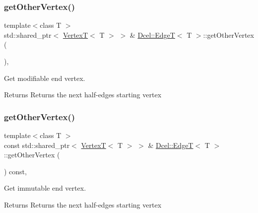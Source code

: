 \subsubsection{\texorpdfstring{get\+Other\+Vertex()}{getOtherVertex()}\hspace{0.1cm}{\footnotesize\ttfamily [1/2]}}
{\footnotesize\ttfamily template$<$class T $>$ \\
std\+::shared\+\_\+ptr$<$ \hyperlink{classDcel_1_1VertexT}{VertexT}$<$ T $>$ $>$ \& \hyperlink{classDcel_1_1EdgeT}{Dcel\+::\+EdgeT}$<$ T $>$\+::get\+Other\+Vertex (\begin{DoxyParamCaption}{ }\end{DoxyParamCaption})\hspace{0.3cm}{\ttfamily [inline]}, {\ttfamily [noexcept]}}



Get modifiable end vertex. 

\begin{DoxyReturn}{Returns}
Returns the next half-\/edge\textquotesingle{}s starting vertex 
\end{DoxyReturn}
\mbox{\label{classDcel_1_1EdgeT_ac2b40be7e45425caaf85b13b50bd89a0}} 
\subsubsection{\texorpdfstring{get\+Other\+Vertex()}{getOtherVertex()}\hspace{0.1cm}{\footnotesize\ttfamily [2/2]}}
{\footnotesize\ttfamily template$<$class T $>$ \\
const std\+::shared\+\_\+ptr$<$ \hyperlink{classDcel_1_1VertexT}{VertexT}$<$ T $>$ $>$ \& \hyperlink{classDcel_1_1EdgeT}{Dcel\+::\+EdgeT}$<$ T $>$\+::get\+Other\+Vertex (\begin{DoxyParamCaption}{ }\end{DoxyParamCaption}) const\hspace{0.3cm}{\ttfamily [inline]}, {\ttfamily [noexcept]}}



Get immutable end vertex. 

\begin{DoxyReturn}{Returns}
Returns the next half-\/edge\textquotesingle{}s starting vertex 
\end{DoxyReturn}
\mbox{\label{classDcel_1_1EdgeT_a1a076a12b7e269aecd77172b1d4c57e1}} 
